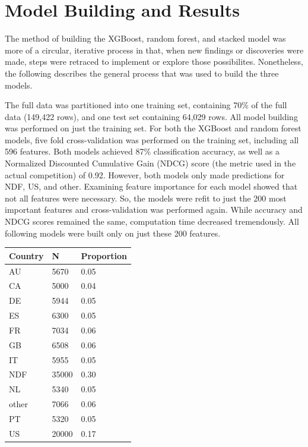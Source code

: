 \documentclass{article}
\begin{document}
\section{Model Building and Results}

The method of building the XGBoost, random forest, and stacked model was more of a circular, iterative 
process in that, when new findings or discoveries were made, steps were retraced to implement or explore 
those possibilites. Nonetheless, the following describes the general process that was used to build the
three models. 

The full data was partitioned into one training set, containing 70\% of the full data (149,422 rows), and one 
test set containing 64,029 rows. All model building was performed on just the training set. For both the XGBoost 
and random forest models, five fold cross-validation was performed on the training set, including all 596 features. 
Both models achieved 87\% classification accuracy, as well as a Normalized Discounted Cumulative Gain (NDCG) score 
(the metric used in the actual competition) of 0.92. However, both models only made predictions for NDF, US, and 
other. Examining feature importance for each model showed that not all features were necessary. So, the models were 
refit to just the 200 most important features and cross-validation was performed again. While accuracy and NDCG
scores remained the same, computation time decreased tremendously. All following models were built only on just these 
200 features. 

\begin{table}[ht]
\centering
\begin{tabular}{| l | l | l |}
  \hline
  \textbf{Country} & \textbf{N} & \textbf{Proportion} \\ 
  \hline
  AU & 5670 & 0.05 \\ 
  CA & 5000 & 0.04 \\ 
  DE & 5944 & 0.05 \\ 
  ES & 6300 & 0.05 \\ 
  FR & 7034 & 0.06 \\ 
  GB & 6508 & 0.06 \\ 
  IT & 5955 & 0.05 \\ 
  NDF & 35000 & 0.30 \\ 
  NL & 5340 & 0.05 \\ 
  other & 7066 & 0.06 \\ 
  PT & 5320 & 0.05 \\ 
  US & 20000 & 0.17 \\ 
   \hline
\end{tabular}
\label{table:smote}
\end{table}
\end{document}
